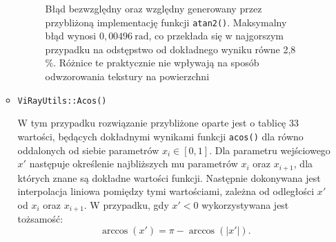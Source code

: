 \begin{enumerate}
\begin{itemize}
\begin{figure}[H]
\centering
{}
\caption[Błąd bezwzględny oraz względny generowany przez przybliżoną implementację funkcji \texttt{atan2()}]{Błąd bezwzględny oraz względny generowany przez przybliżoną implementację funkcji \texttt{atan2()}. Maksymalny błąd wynosi $0,00496\ \mathrm{rad}$, co przekłada się w najgorszym przypadku na odstępstwo od dokładnego wyniku równe 2,8 \%. Różnice te praktycznie nie wpływają na sposób odwzorowania tekstury na powierzchni}
\label{ch3:img:atan2_error}
\end{figure}


\item \texttt{ViRayUtils::Acos()}

W tym przypadku rozwiązanie przybliżone oparte jest o tablicę 33 wartości, będących dokładnymi wynikami funkcji \texttt{acos()} dla równo oddalonych od siebie parametrów $x_i \in [0, 1]$. Dla parametru wejściowego $x'$ następuje określenie najbliższych mu parametrów $x_i$ oraz $x_{i+1}$, dla których znane są dokładne wartości funkcji. Następnie dokonywana jest interpolacja liniowa pomiędzy tymi wartościami, zależna od odległości $x'$ od $x_i$ oraz $x_{i+1}$. W przypadku, gdy $x' < 0$ wykorzystywana jest tożsamość:
\begin{equation}
\arccos(x') = \pi - \arccos(|x'|).
\end{equation}


\end{itemize}
\end{enumerate}
